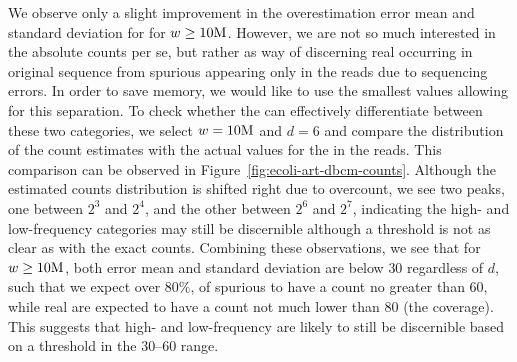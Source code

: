 We observe only a slight improvement in the overestimation error mean and standard deviation for for $w\geq 10\mega$. However, we are not so much interested in the absolute counts per se, but rather as way of discerning real \kmers occurring in original sequence from spurious \kmers appearing only in the reads due to sequencing errors. In order to save memory, we would like to use the smallest values allowing for this separation.
To check whether the \dBCM can effectively differentiate between these two categories, we select $w=10\mega$ and $d=6$ and compare the distribution of the count estimates with the actual values for the  in the reads. This comparison can be observed in Figure~\ref{fig:ecoli-art-dbcm-counts}.  Although the estimated counts distribution is shifted right due to overcount, we see two peaks, one between $2^3$ and $2^4$, and the other between $2^6$ and $2^7$, indicating the high- and low-frequency categories may still be discernible although a threshold is not as clear as with the exact counts.
Combining these observations, we see that for $w \geq 10\mega$, both error mean and standard deviation are below $30$ regardless of $d$, such that we expect over $80\%$, of spurious  to have a count no greater than $60$, while real  are expected to have a count not much lower than $80$ (the coverage). This suggests that high- and low-frequency  are likely to still be discernible based on a threshold in the 30--60 range.


